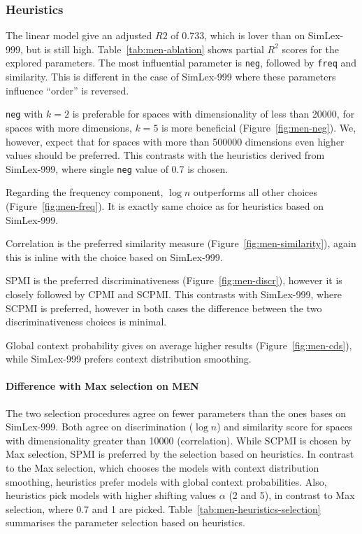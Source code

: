 \subsubsection{Heuristics}
\label{sec:heuristics-men}


The linear model give an adjusted $R2$ of 0.733, which is lover than on SimLex-999, but is still high. Table~\ref{tab:men-ablation} shows partial $R^2$ scores for the explored parameters. The most influential parameter is \texttt{neg}, followed by \texttt{freq} and similarity. This is different in the case of SimLex-999 where these parameters influence ``order'' is reversed.


\texttt{neg} with $k = 2$ is preferable for spaces with dimensionality of less than 20000, for spaces with more dimensions, $k = 5$ is more beneficial (Figure~\ref{fig:men-neg}).  We, however, expect that for spaces with more than 500000 dimensions even higher values should be preferred. This contrasts with the heuristics derived from SimLex-999, where single \texttt{neg} value of 0.7 is chosen.


Regarding the frequency component, $\log n$ outperforms all other choices (Figure~\ref{fig:men-freq}). It is exactly same choice as for heuristics based on SimLex-999.


Correlation is the preferred similarity measure (Figure~\ref{fig:men-similarity}), again this is inline with the choice based on SimLex-999.


SPMI is the preferred discriminativeness (Figure~\ref{fig:men-discr}), however it is closely followed by CPMI and SCPMI. This contrasts with SimLex-999, where SCPMI is preferred, however in both cases the difference between the two discriminativeness choices is minimal.


Global context probability gives on average higher results (Figure~\ref{fig:men-cds}), while SimLex-999 prefers context distribution smoothing.

\paragraph{Difference with Max selection on MEN}



The two selection procedures agree on fewer parameters than the ones bases on SimLex-999. Both agree on discrimination ($\log n$) and similarity score for spaces with dimensionality greater than 10000 (correlation). While SCPMI is chosen by Max selection, SPMI is preferred by the selection based on heuristics. In contrast to the Max selection, which chooses the models with context distribution smoothing, heuristics prefer models with global context probabilities. Also, heuristics pick models with higher shifting values $\alpha$ (2 and 5), in contrast to Max selection, where 0.7 and 1 are picked. Table~\ref{tab:men-heuristics-selection} summarises the parameter selection based on heuristics.

